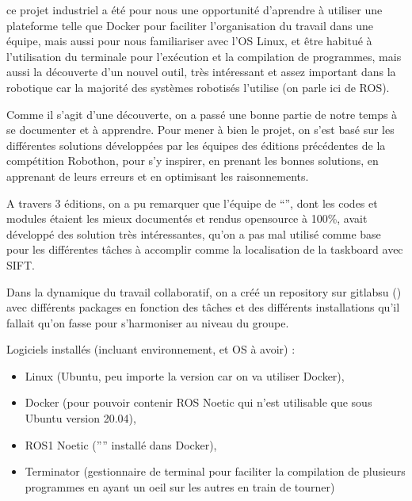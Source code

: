 \documentclass[letterpaper,10pt,english]{sphinxmanual}
\begin{document}
\sphinxAtStartPar
ce projet industriel a été pour nous une opportunité d’aprendre à utiliser une plateforme telle que Docker pour faciliter l’organisation du travail dans une équipe, mais aussi pour nous familiariser avec l’OS Linux, et être habitué à l’utilisation du terminale pour l’exécution et la compilation de programmes, mais aussi la découverte d’un nouvel outil, très intéressant et assez important dans la robotique car la majorité des systèmes robotisés l’utilise (on parle ici de ROS).

\sphinxAtStartPar
Comme il s’agit d’une découverte, on a passé une bonne partie de notre temps à se documenter et à apprendre. Pour mener à bien le projet, on s’est basé sur les différentes solutions développées par les équipes des éditions précédentes de la compétition Robothon, pour s’y inspirer, en prenant les bonnes solutions, en apprenant de leurs erreurs et en optimisant les raisonnements.

\sphinxAtStartPar
A travers 3 éditions, on a pu remarquer que l’équipe de “”, dont les codes et modules étaient les mieux documentés et rendus open\sphinxhyphen{}source à 100\%, avait développé des solution très intéressantes, qu’on a pas mal utilisé comme base pour les différentes tâches à accomplir comme la localisation de la task\sphinxhyphen{}board avec SIFT.

\sphinxAtStartPar
Dans la dynamique du travail collaboratif, on a créé un repository sur gitlabsu () avec différents packages en fonction des tâches et des différents installations qu’il fallait qu’on fasse pour s’harmoniser au niveau du groupe.

\sphinxAtStartPar
{}

\sphinxAtStartPar
Logiciels installés (incluant environnement, et OS à avoir) :
\begin{itemize}
\item {} 
\sphinxAtStartPar
Linux (Ubuntu, peu importe la version car on va utiliser Docker),

\item {} 
\sphinxAtStartPar
Docker (pour pouvoir contenir ROS Noetic qui n’est utilisable que sous Ubuntu version 20.04),

\item {} 
\sphinxAtStartPar
ROS1 Noetic (”” installé dans Docker),

\item {} 
\sphinxAtStartPar
Terminator (gestionnaire de terminal pour faciliter la compilation de plusieurs programmes en ayant un oeil sur les autres en train de tourner)

\end{itemize}
\end{document}
